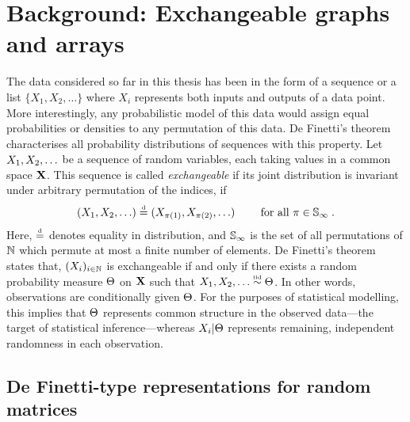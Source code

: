 \section{Background: Exchangeable graphs and arrays}
\label{sec:background}


The data considered so far in this thesis has been in the form of a sequence or a list \eg $\{X_1, X_2, \dots\}$ where $X_i$ represents both inputs and outputs of a data point.
More interestingly, any probabilistic model of this data would assign equal probabilities or densities to any permutation of this data.
De Finetti's theorem \citep[e.g.][]{Kallenberg:2005} characterises all probability distributions of sequences with this property.
Let $X_1,X_2,\ldots$ be a sequence of random variables, each taking values in a common space $\mathbf{X}$.
This sequence is called \emph{exchangeable} if its joint distribution  is invariant under arbitrary permutation of the indices, \ie if
\begin{equation}
  \label{eq:exchangeability}
  (X_1,X_2,\ldots) \stackrel{\mbox{\tiny d}}{=} (X_{\pi(1)},X_{\pi(2)},\ldots) \qquad\text{ for all } \pi\in\mathbb{S}_{\infty}\;.
\end{equation}
Here, $\stackrel{\mbox{\tiny d}}{=}$ denotes equality in distribution, and $\mathbb{S}_{\infty}$ is the set of all permutations of $\mathbb{N}$ which permute at most a finite number of elements.
De Finetti's theorem states that, $(X_i)_{i\in\mathbb{N}}$ is exchangeable if and only if there exists a random probability measure $\Theta$ on $\mathbf{X}$ such that $X_1,X_2,\ldots\overset{\mbox{\tiny iid}}{\sim}\Theta$.
In other words, observations are conditionally \iid given $\Theta$.
For the purposes of statistical modelling, this implies that $\Theta$ represents common structure in the observed data---the target of statistical inference---whereas $X_i|\Theta$ represents remaining, independent randomness in each observation. 

\subsection{De Finetti-type representations for random matrices}

